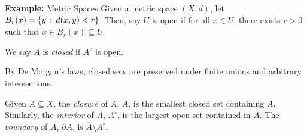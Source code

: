 \begin{example}{\textbf{Example:} Metric Spaces}
    Given a metric space $(X, d)$, let $B_r(x) = \{y \, :\, d(x, y) < r\}$. Then, say $U$ is open if for all $x \in U$, there exists $r > 0$ such that $x \in B_r(x) \subseteq U$.
\end{example}

\begin{definition}
    We say $A$ is \emph{closed} if $A^{c}$ is open.
\end{definition}

By De Morgan's laws, closed sets are preserved under finite unions and arbitrary intersections.

\begin{definition}
    Given $A \subseteq X$, the \emph{closure} of $A$, $\overline{A}$, is the smallest closed set containing $A$. Similarly, the \emph{interior} of $A$, $A^{\circ}$, is the largest open set contained in $A$. The \emph{boundary} of $A$, $\partial A$, is $\overline{A} \setminus A^{\circ}$.
\end{definition}
